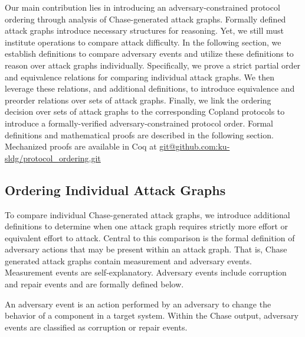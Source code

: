 \documentclass[runningheads]{llncs}
\theoremstyle{definition}
\begin{document}
Our main contribution lies in introducing an adversary-constrained protocol ordering through analysis of Chase-generated attack graphs. Formally defined attack graphs introduce necessary structures for reasoning. Yet, we still must institute operations to compare attack difficulty. In the following section, we establish definitions to compare adversary events and utilize these definitions to reason over attack graphs individually. Specifically, we prove a strict partial order and equivalence relations for comparing individual attack graphs. We then leverage these relations, and additional definitions, to introduce equivalence and preorder relations over sets of attack graphs. Finally, we link the ordering decision over sets of attack graphs to the corresponding Copland protocols to introduce a formally-verified adversary-constrained protocol order. Formal definitions and mathematical proofs are described in the following section. Mechanized proofs are available in Coq at \url{git@github.com:ku-sldg/protocol_ordering.git}

\subsection*{Ordering Individual Attack Graphs}

To compare individual Chase-generated attack graphs, we introduce additional definitions to determine when one attack graph requires strictly more effort or equivalent effort to attack. Central to this comparison is the formal definition of adversary actions that may be present within an attack graph. That is, Chase generated attack graphs contain measurement and adversary events. Measurement events are self-explanatory. Adversary events include corruption and repair events and are formally defined below.


\begin{definition}
    An adversary event is an action performed by an adversary to change the behavior of a component in a target system. Within the Chase output, adversary events are classified as  corruption or repair events. 
\end{definition}
\end{document}
